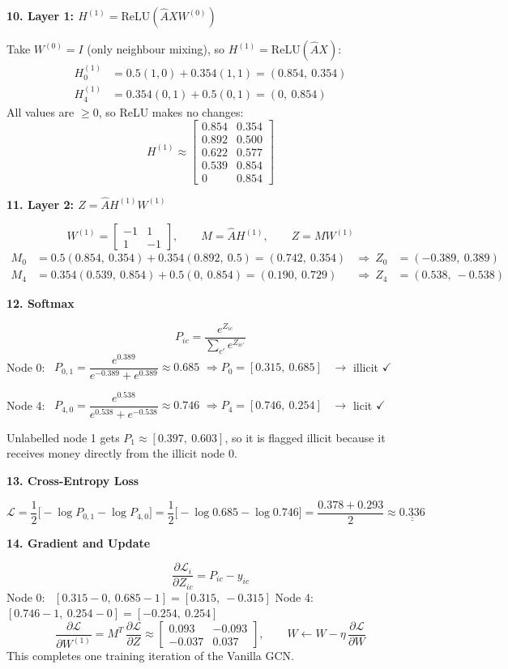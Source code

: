 \documentclass[12pt,a4paper]{article}
\newcommand{\Ahat}{\hat A}
\newcommand{\h}[1]{\par\needspace{6\baselineskip}\medskip\textbf{\large #1}\par}
\begin{document}
\h{10. Layer 1: $H^{(1)} = \mathrm{ReLU}(\Ahat X W^{(0)})$}
Take $W^{(0)} = I$ (only neighbour mixing), so $H^{(1)} = \mathrm{ReLU}(\Ahat X)$:
\begin{align*}
  H^{(1)}_0 &= 0.5(1,0) + 0.354(1,1) = (0.854,\ 0.354)\\
  H^{(1)}_4 &= 0.354(0,1) + 0.5(0,1) = (0,\ 0.854)
\end{align*}
All values are $\ge 0$, so ReLU makes no changes:
\[
  H^{(1)} \approx \begin{bmatrix}
  0.854 & 0.354\\ 0.892 & 0.500\\ 0.622 & 0.577\\ 0.539 & 0.854\\ 0 & 0.854
  \end{bmatrix}
\]

\h{11. Layer 2: $Z = \Ahat H^{(1)} W^{(1)}$}
\[
  W^{(1)} = \begin{bmatrix} -1 & 1\\ 1 & -1 \end{bmatrix}, \qquad M = \Ahat H^{(1)}, \qquad Z = M W^{(1)}
\]
\begin{align*}
  M_0 &= 0.5(0.854,\ 0.354) + 0.354(0.892,\ 0.5) = (0.742,\ 0.354) &\Rightarrow\ Z_0 &= (-0.389,\ 0.389)\\
  M_4 &= 0.354(0.539,\ 0.854) + 0.5(0,\ 0.854) = (0.190,\ 0.729) &\Rightarrow\ Z_4 &= (0.538,\ -0.538)
\end{align*}

\h{12. Softmax}
\[
  P_{ic} = \frac{e^{Z_{ic}}}{\sum_{c'} e^{Z_{ic'}}}
\]
Node 0: \ $P_{0,1} = \dfrac{e^{0.389}}{e^{-0.389} + e^{0.389}} \approx 0.685$
\quad $\Rightarrow P_0 = [0.315,\ 0.685]$ \ $\rightarrow$ illicit $\checkmark$

Node 4: \ $P_{4,0} = \dfrac{e^{0.538}}{e^{0.538} + e^{-0.538}} \approx 0.746$
\quad $\Rightarrow P_4 = [0.746,\ 0.254]$ \ $\rightarrow$ licit $\checkmark$

Unlabelled node 1 gets $P_1 \approx [0.397,\ 0.603]$, so it is flagged illicit because it receives money directly from the illicit node 0.

\h{13. Cross-Entropy Loss}
\[
  \mathcal L = \frac12\big[-\log P_{0,1} - \log P_{4,0}\big] = \frac12\big[-\log 0.685 - \log 0.746\big]
  = \frac{0.378 + 0.293}{2} \approx \underline{\underline{0.336}}
\]

\h{14. Gradient and Update}
\[
  \frac{\partial \mathcal L_i}{\partial Z_{ic}} = P_{ic} - y_{ic}
\]
Node 0: \ $[0.315 - 0,\ 0.685 - 1] = [0.315,\ -0.315]$ \qquad
Node 4: \ $[0.746 - 1,\ 0.254 - 0] = [-0.254,\ 0.254]$
\[
  \frac{\partial\mathcal L}{\partial W^{(1)}} = M^T\,\frac{\partial\mathcal L}{\partial Z} \approx
  \begin{bmatrix} 0.093 & -0.093\\ -0.037 & 0.037 \end{bmatrix},
  \qquad
  W \leftarrow W - \eta\,\frac{\partial\mathcal L}{\partial W}
\]
This completes one training iteration of the Vanilla GCN.
\end{document}
